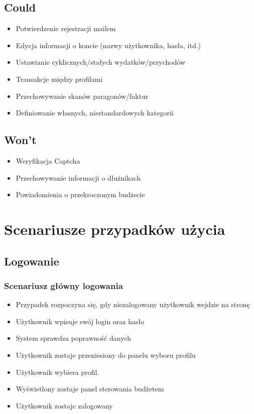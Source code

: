 \documentclass[12pt,a4paper,oneside]{article}
\begin{document}
\subsection{Could}
\begin{itemize}
    \item Potwierdzenie rejestracji mailem
    \item Edycja informacji o koncie (nazwy użytkownika, hasła, itd.)
    \item Ustawianie cyklicznych/stałych wydatków/przychodów
    \item Transakcje między profilami
    \item Przechowywanie skanów paragonów/faktur
    \item Definiowanie własnych, niestandardowych kategorii
\end{itemize}

\subsection{Won't}
\begin{itemize}
    \item Weryfikacja Captcha
    \item Przechowywanie informacji o dłużnikach
    \item Powiadomienia o przekroczonym budżecie
\end{itemize}

\section{Scenariusze przypadków użycia}
\subsection{Logowanie}
\subsubsection{Scenariusz główny logowania}
\begin{itemize}
    \item Przypadek rozpoczyna się, gdy niezalogowany użytkownik wejdzie
          na stronę
    \item Użytkownik wpisuje swój login oraz hasło
    \item System sprawdza poprawność danych
    \item Użytkownik zostaje przeniesiony do panelu wyboru profilu
    \item Użytkownik wybiera profil.
    \item Wyświetlony zostaje panel sterowania budżetem
    \item Użytkownik zostaje zalogowany
\end{itemize}
\end{document}
